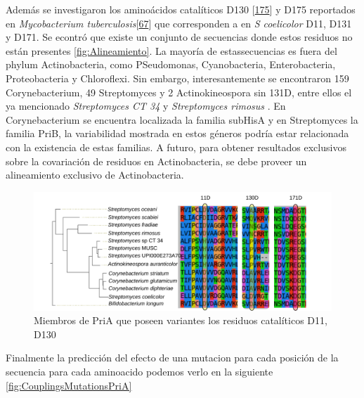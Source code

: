 \documentclass[12pt,twoside]{reedthesis}
\begin{document}
{  Además se investigaron los aminoácidos catalíticos D130
  {[}\protect\hyperlink{ref-due_bisubstrate_2011}{175}{]} y D175
  reportados en \emph{Mycobacterium
  tuberculosis}{[}\protect\hyperlink{ref-verduzco-castro_co-occurrence_2016}{67}{]}
  que corresponden a en \emph{S coelicolor} D11, D131 y D171. Se econtró
  que existe un conjunto de secuencias donde estos residuos no están
  presentes \autoref{fig:Alineamiento}. La mayoría de estassecuencias es
  fuera del phylum Actinobacteria, como PSeudomonas, Cyanobacteria,
  Enterobacteria, Proteobacteria y Chloroflexi. Sin embargo,
  interesantemente se encontraron 159 Corynebacterium, 49 Streptomyces y 2
  Actinokineospora sin 131D, entre ellos el ya mencionado
  \emph{Streptomyces CT 34} y \emph{Streptomyces rimosus} . En
  Corynebacterium se encuentra localizada la familia subHisA y en
  Streptomyces la familia PriB, la variabilidad mostrada en estos géneros
  podría estar relacionada con la existencia de estas familias. A futuro,
  para obtener resultados exclusivos sobre la covariación de residuos en
  Actinobacteria, se debe proveer un alineamiento exclusivo de
  Actinobacteria.
  
  \begin{figure}[h!tbp]
  \centering
  \includegraphics[angle = 0,scale = .5]{chapter4/Couplings/HIS4_STRCO_1-200/align/alineamiento.pdf}
  \caption[Miembros de PriA que poseen variantes los residuos catalíticos D11, D130]{\footnotesize{Miembros de PriA que poseen variantes los residuos catalíticos D11, D130}}
  \label{fig:Alineamiento}
  \end{figure}
  
  Finalmente la predicción del efecto de una mutacion para cada posición
  de la secuencia para cada aminoacido podemos verlo en la siguiente
  \autoref{fig:CouplingsMutationsPriA}
  
}
\end{document}

